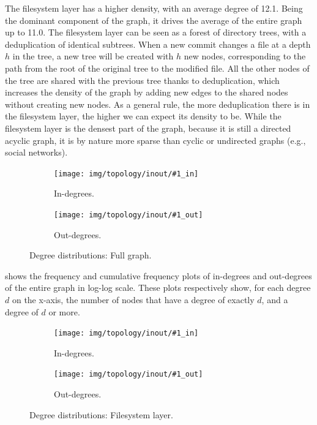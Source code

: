 The filesystem layer has a higher density, with an average degree of 12.1.
Being the dominant component of the graph, it drives the average of the entire
graph up to 11.0. The filesystem layer can be seen as a forest of directory
trees, with a deduplication of identical subtrees. When a new commit changes a
file at a depth $h$ in the tree, a new tree will be created with $h$ new nodes,
corresponding to the path from the root of the original tree to the modified
file. All the other nodes of the tree are shared with the previous tree
thanks to deduplication, which increases the density of the graph by adding
new edges to the shared nodes without creating new nodes. As a general
rule, the more deduplication there is in the filesystem layer, the higher we
can expect its density to be.
While the filesystem layer is the densest part of the graph, because it is
still a directed acyclic graph, it is by nature more sparse than cyclic or
undirected graphs (e.g., social networks).

\newcommand{\plotinout}[2]{%
\begin{figure}%
    \begin{subfigure}{.49\textwidth}%
        \centering%
        \texttt{[image: img/topology/inout/\#1\_in]}%
        \caption{In-degrees.}%
        \label{fig:inout_in_#1}
    \end{subfigure}\hfill%
    \begin{subfigure}{.49\textwidth}%
        \centering%
        \texttt{[image: img/topology/inout/\#1\_out]}%
        \caption{Out-degrees.}%
        \label{fig:inout_out_#1}
    \end{subfigure}%
    \caption{Degree distributions: #2.}%
    \label{fig:inout_#1}
\end{figure}%
}

\plotinout{full}{Full graph}

 shows the frequency and cumulative frequency plots
of in-degrees and out-degrees of the entire graph in log-log scale.  These plots
respectively show, for each degree $d$ on the x-axis, the number of nodes that
have a degree of exactly $d$, and a degree of $d$ or more.

\plotinout{dir+cnt}{Filesystem layer}

